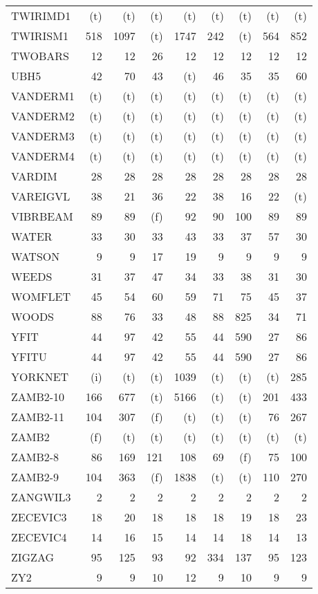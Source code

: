 \documentclass[11pt,twoside]{article}
\begin{document}
{\begin{longtable}[c]{|l|r|r|r|r|r|r|r|r|}
 TWIRIMD1 & (t) & (t) & (t) & (t) & (t) & (t) & (t) & (t) \\
 TWIRISM1 & 518 & 1097 & (t) & 1747 & 242 & (t) & 564 & 852 \\
 TWOBARS & 12 & 12 & 26 & 12 & 12 & 12 & 12 & 12 \\
 UBH5 & 42 & 70 & 43 & (t) & 46 & 35 & 35 & 60 \\
 VANDERM1 & (t) & (t) & (t) & (t) & (t) & (t) & (t) & (t) \\
 VANDERM2 & (t) & (t) & (t) & (t) & (t) & (t) & (t) & (t) \\
 VANDERM3 & (t) & (t) & (t) & (t) & (t) & (t) & (t) & (t) \\
 VANDERM4 & (t) & (t) & (t) & (t) & (t) & (t) & (t) & (t) \\
 VARDIM & 28 & 28 & 28 & 28 & 28 & 28 & 28 & 28 \\
 VAREIGVL & 38 & 21 & 36 & 22 & 38 & 16 & 22 & (t) \\
 VIBRBEAM & 89 & 89 & (f) & 92 & 90 & 100 & 89 & 89 \\
 WATER & 33 & 30 & 33 & 43 & 33 & 37 & 57 & 30 \\
 WATSON & 9 & 9 & 17 & 19 & 9 & 9 & 9 & 9 \\
 WEEDS & 31 & 37 & 47 & 34 & 33 & 38 & 31 & 30 \\
 WOMFLET & 45 & 54 & 60 & 59 & 71 & 75 & 45 & 37 \\
 WOODS & 88 & 76 & 33 & 48 & 88 & 825 & 34 & 71 \\
 YFIT & 44 & 97 & 42 & 55 & 44 & 590 & 27 & 86 \\
 YFITU & 44 & 97 & 42 & 55 & 44 & 590 & 27 & 86 \\
 YORKNET & (i) & (t) & (t) & 1039 & (t) & (t) & (t) & 285 \\
 ZAMB2-10 & 166 & 677 & (t) & 5166 & (t) & (t) & 201 & 433 \\
 ZAMB2-11 & 104 & 307 & (f) & (t) & (t) & (t) & 76 & 267 \\
 ZAMB2 & (f) & (t) & (t) & (t) & (t) & (t) & (t) & (t) \\
 ZAMB2-8 & 86 & 169 & 121 & 108 & 69 & (f) & 75 & 100 \\
 ZAMB2-9 & 104 & 363 & (f) & 1838 & (t) & (t) & 110 & 270 \\
 ZANGWIL3 & 2 & 2 & 2 & 2 & 2 & 2 & 2 & 2 \\
 ZECEVIC3 & 18 & 20 & 18 & 18 & 18 & 19 & 18 & 23 \\
 ZECEVIC4 & 14 & 16 & 15 & 14 & 14 & 18 & 14 & 13 \\
 ZIGZAG & 95 & 125 & 93 & 92 & 334 & 137 & 95 & 123 \\
 ZY2 & 9 & 9 & 10 & 12 & 9 & 10 & 9 & 9 \\
\end{longtable}
}
\end{document}
